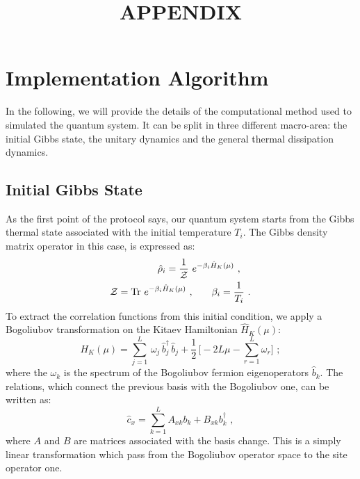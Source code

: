 \documentclass[pra,twocolumn,preprintnumbers,amsmath,amssymb,nofootinbib,floatfix,longbibliography]{revtex4}
\begin{document}
\title{APPENDIX}

\author{}
\affiliation{}


\begin{abstract}
\end{abstract}
\maketitle

\appendix

\section{Implementation Algorithm}

In the following, we will provide the details of the
computational method used to simulated the quantum system.
It can be split in three different macro-area: the initial
Gibbs state, the unitary dynamics and the general thermal
dissipation dynamics.

\subsection{Initial Gibbs State}

As the first point of the protocol says, our quantum system
starts from the Gibbs thermal state associated with the
initial temperature $T_i$. The Gibbs density matrix
operator in this case, is expressed as:
\begin{align}
	\label{Gibbs}
	\hat \rho_i  = \frac{1}{\cal Z} \,\,&
	e^{-\beta_i \hat H_K(\mu)} \,\,,\\
    {\cal Z} =
	{\rm Tr} \,\,e^{-\beta_i \hat H_K(\mu)} \,\,, & \qquad
	\beta_i  = \frac{1}{T_i} \,\,.
\end{align}
To extract the correlation functions from this initial
condition, we apply a Bogoliubov transformation on the
Kitaev Hamiltonian $\hat H_K(\mu)$:
\begin{equation}
	\label{HKdiag}
	H_K(\mu)=\sum _{j=1}^L\,\omega _j \,\hat b^\dagger _j\,
	\hat b_j+ \frac{1}{2}\,\Bigr[ -2L\mu - \sum _{r=1}^L
	\omega _r \Bigr] \,\,;
\end{equation}
where the $\omega_k$ is the spectrum of the Bogoliubov
fermion eigenoperators $\hat b_k$. The relations, which
connect the previous basis with the Bogoliubov one, can be
written as:
\begin{equation}
  \label{transBogol}
  \hat c_x = \sum_{k=1}^L A_{xk} b_k + B_{xk} b^\dagger_k
  \,\,,
\end{equation}
where $A$ and $B$ are matrices associated with the basis
change. This is a simply linear transformation which pass
from the Bogoliubov operator space to the site operator one.\\
\end{document}
